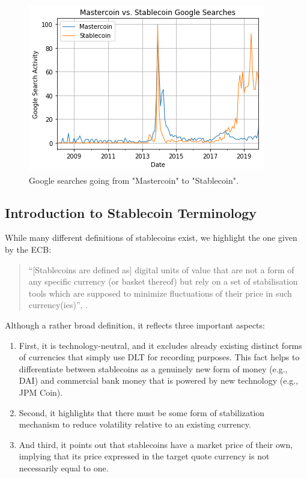 \documentclass[conference]{IEEEtran}
\begin{document}
\begin{figure}[htbp]
	\centerline{
		\includegraphics[width=\linewidth]{googleSearchActivity.png}
		}
	\caption{Google searches going from "Mastercoin" to "Stablecoin".}
	\label{fig:mastercoin}
\end{figure}

\subsection{Introduction to Stablecoin Terminology}
While many different definitions of stablecoins exist, we highlight the one given by the \ac{ECB}:

\begin{quote}
	\textquotedblleft [Stablecoins are defined as] digital units of value that are not a form of any specific currency (or basket thereof) but rely on a set of stabilisation tools which are supposed to minimize fluctuations of their price in such currency(ies)\textquotedblright, \cite{ECB}.
\end{quote}

Although a rather broad definition, it reflects three important aspects:
\begin{enumerate}
	\item First, it is technology-neutral, and it excludes already existing distinct forms of currencies that simply use \ac{DLT} for recording purposes. This fact helps to differentiate between stablecoins as a genuinely new form of money (e.g., DAI) and commercial bank money that is powered by new technology (e.g., JPM Coin).
	\item Second, it highlights that there must be some form of stabilization mechanism to reduce volatility relative to an existing currency.
	\item And third, it points out that stablecoins have a market price of their own, implying that its price expressed in the target quote currency is not necessarily equal to one.
\end{enumerate}
\end{document}
